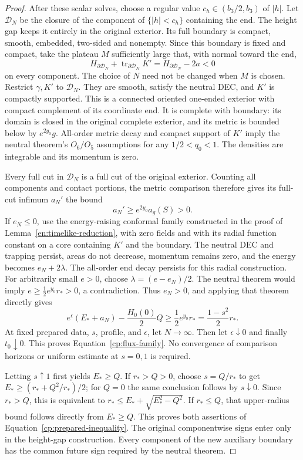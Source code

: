 \begin{proof}
After these scalar solves, choose a regular value
$c_h\in(b_3/2,b_3)$ of $|h|$.  Let $\mathcal D_N$ be the closure
of the component of $\{|h|<c_h\}$ containing the end.
The height gap keeps it entirely in the original exterior.
Its full boundary is compact, smooth, embedded, two-sided and
nonempty.  Since this boundary is fixed and compact, take the
plateau $M$ sufficiently large that, with normal toward the end,
\[
 H_{\partial\mathcal D_N}+
      \operatorname{tr}_{\partial\mathcal D_N}K'
       =H_{\partial\mathcal D_N}-2a<0
\]
on every component.  The choice of $N$ need not be changed when
$M$ is chosen.  Restrict $\gamma,K'$ to $\mathcal D_N$.
They are smooth, satisfy the neutral DEC, and $K'$ is compactly
supported.  This is a connected oriented one-ended exterior with
compact complement of its coordinate end.  It is complete with
boundary: its domain is closed in the original complete exterior,
and its metric is bounded below by $e^{2y_0}g$.
All-order metric decay and compact support of $K'$ imply the
neutral theorem's $O_6/O_5$ assumptions for any $1/2<q_0<1$.
The densities are integrable and its momentum is zero.

Every full cut in $\mathcal D_N$ is a full cut of the original
exterior.  Counting all components and contact portions, the metric
comparison therefore gives its full-cut infimum $a_N'$ the bound
\[
 a_N'\ge e^{2y_0}a_g(S)>0.
\]
If $e_N\le0$, use the energy-raising conformal family constructed
in the proof of Lemma~\ref{en:timelike-reduction}, with zero fields
and with its radial function constant on a core containing
$K'$ and the boundary.  The neutral DEC and trapping persist,
areas do not decrease, momentum remains zero, and the energy
becomes $e_N+2\lambda$.  The all-order end decay persists for this
radial construction.  For arbitrarily small $e>0$, choose
$\lambda=(e-e_N)/2$.  The neutral theorem would imply
$e\ge\tfrac12e^{y_0}r_*>0$, a contradiction.
Thus $e_N>0$, and applying that theorem directly gives
\[
 e^\epsilon(E_*+a_N)-\frac{H_0(0)}2Q
      \ge\frac12e^{y_0}r_*=
                    \frac{1-s^2}{2}r_*.
\]
At fixed prepared data, $s$, profile, and $\epsilon$, let
$N\to\infty$.  Then let $\epsilon\downarrow0$ and finally
$t_0\downarrow0$.  This proves Equation~\eqref{cp:flux-family}.
No convergence of comparison horizons or uniform estimate at
$s=0,1$ is required.

Letting $s\uparrow1$ first yields $E_*\ge Q$.
If $r_*>Q>0$, choose $s=Q/r_*$ to get
$E_*\ge(r_*+Q^2/r_*)/2$; for $Q=0$ the same conclusion follows
by $s\downarrow0$.  Since $r_*>Q$, this is equivalent to
$r_*\le E_*+\sqrt{E_*^2-Q^2}$.  If $r_*\le Q$, that upper-radius
bound follows directly from $E_*\ge Q$.  This proves both
assertions of Equation~\eqref{cp:prepared-inequality}.
The original componentwise signs enter only in the height-gap
construction.  Every component of the new auxiliary boundary has
the common future sign required by the neutral theorem.
\end{proof}

